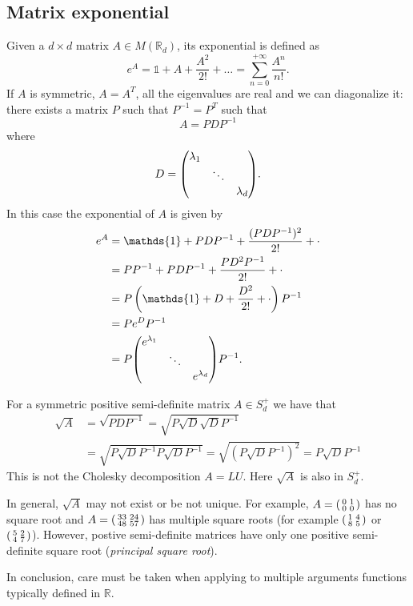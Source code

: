 \subsection{Matrix exponential}
Given a $d\times d$ matrix $A\in M(\mathbb{R}_d)$, its exponential is defined as
\begin{equation*}
    e^A = \mathds{1} + A + \frac{A^2}{2!} + \dots = \sum_{n=0}^{+\infty} \frac{A^n}{n!}.
\end{equation*}
If $A$ is symmetric, $A = A^T$, all the eigenvalues are real and we can diagonalize it: there exists a matrix $P$ such that $P^{-1}=P^T$ such that
\begin{equation*}
    A = PDP^{-1}
\end{equation*}
where
\begin{equation*}
    D = \mqty(\dmat{\lambda_1,\ddots,\lambda_d}).
\end{equation*}
In this case the exponential of $A$ is given by
\begin{align*}
    e^A &= \mathds{1} + PDP^{-1} + \frac{(PDP^{-1})^2}{2!} + \cdot \\
    &=
    PP^{-1} + PDP^{-1} + \frac{PD^2P^{-1}}{2!} + \cdot \\
    &=
    P\left(\mathds{1} + D + \frac{D^2}{2!} + \cdot\right)P^{-1} \\
    &=
    Pe^DP^{-1} \\
    &=
    P\mqty(\dmat{e^{\lambda_1},\ddots,e^{\lambda_d}})P^{-1}.
\end{align*}
\begin{remark}
    For a symmetric positive semi-definite matrix $A\in S^+_d$ we have that
    \begin{align*}
        \sqrt{A} &= \sqrt{PDP^{-1}} = \sqrt{P\sqrt{D}\sqrt{D}P^{-1}} \\
        &=
        \sqrt{P\sqrt{D}P^{-1}P\sqrt{D}P^{-1}} = \sqrt{(P\sqrt{D}P^{-1})^2} = P\sqrt{D}P^{-1}
    \end{align*}
    This is not the Cholesky decomposition $A=LU$. Here $\sqrt{A}$ is also in $S^+_d$.
\end{remark}
\begin{remark}
    In general, $\sqrt{A}$ may not exist or be not unique. For example, $A=\smqty(0 & 1 \\ 0 & 0)$ has no square root and $A = \smqty(33 & 24 \\ 48 & 57)$ has multiple square roots (for example $\smqty(1 & 4 \\ 8 & 5)$ or $\smqty(5 & 2 \\ 4 & 7)$). However, postive semi-definite matrices have only one positive semi-definite square root (\emph{principal square root}).
\end{remark}
In conclusion, care must be taken when applying to multiple arguments functions typically defined in $\mathbb{R}$.

